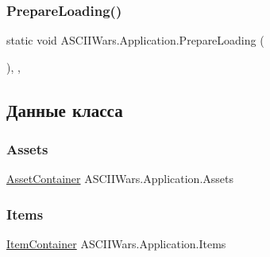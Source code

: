 \hypertarget{class_a_s_c_i_i_wars_1_1_application_a17ad0a44229caa1044d99f975ed97be3}{}\label{class_a_s_c_i_i_wars_1_1_application_a17ad0a44229caa1044d99f975ed97be3} 
\subsubsection{\texorpdfstring{Prepare\+Loading()}{PrepareLoading()}}
{\footnotesize\ttfamily static void A\+S\+C\+I\+I\+Wars.\+Application.\+Prepare\+Loading (\begin{DoxyParamCaption}{ }\end{DoxyParamCaption})\hspace{0.3cm}{\ttfamily [inline]}, {\ttfamily [static]}, {\ttfamily [private]}}



\subsection{Данные класса}
\hypertarget{class_a_s_c_i_i_wars_1_1_application_a85f064f508e8f2448220b04da2ed903c}{}\label{class_a_s_c_i_i_wars_1_1_application_a85f064f508e8f2448220b04da2ed903c} 
\subsubsection{\texorpdfstring{Assets}{Assets}}
{\footnotesize\ttfamily \hyperlink{class_a_s_c_i_i_wars_1_1_game_1_1_asset_container}{Asset\+Container} A\+S\+C\+I\+I\+Wars.\+Application.\+Assets\hspace{0.3cm}{\ttfamily [static]}}

\hypertarget{class_a_s_c_i_i_wars_1_1_application_a8ab343a894ec7b250b5e688d844894de}{}\label{class_a_s_c_i_i_wars_1_1_application_a8ab343a894ec7b250b5e688d844894de} 
\subsubsection{\texorpdfstring{Items}{Items}}
{\footnotesize\ttfamily \hyperlink{class_a_s_c_i_i_wars_1_1_game_1_1_item_container}{Item\+Container} A\+S\+C\+I\+I\+Wars.\+Application.\+Items\hspace{0.3cm}{\ttfamily [static]}}

